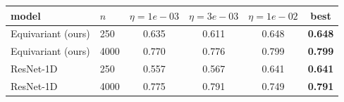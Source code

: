 \begin{tabular}{llcccc}
\toprule
model & $n$ & $\eta=1e-03$ & $\eta=3e-03$ & $\eta=1e-02$ & best \\
\midrule
  Equivariant (ours) & 250 & 0.635 & 0.611 & 0.648 & \textbf{0.648} \\
  Equivariant (ours) & 4000 & 0.770 & 0.776 & 0.799 & \textbf{0.799} \\
  ResNet-1D & 250 & 0.557 & 0.567 & 0.641 & \textbf{0.641} \\
  ResNet-1D & 4000 & 0.775 & 0.791 & 0.749 & \textbf{0.791} \\
\bottomrule
\end{tabular}